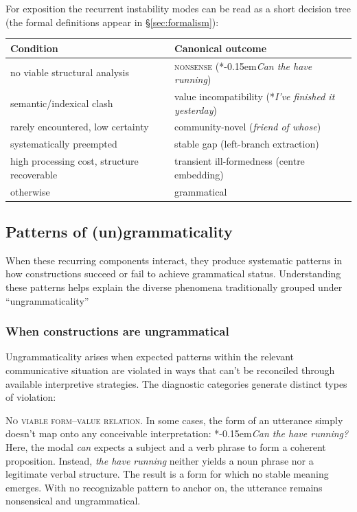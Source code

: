 \documentclass[12pt,letterpaper]{article}
\newcommand{\term}[1]{\textsc{#1}}
\newcommand{\mention}[1]{\textit{#1}}
\newcommand{\judgesep}{\kern-0.15em}
\newcommand{\ungram}[1]{*\judgesep#1}
\begin{document}
For exposition the recurrent instability modes can be read as a short decision tree (the formal definitions appear in \S\ref{sec:formalism}):

\begin{center}
\begin{tabular}{@{}l@{\;$\longrightarrow$\;}l@{}}
\toprule
Condition & Canonical outcome\\
\midrule
no viable structural analysis &
\term{nonsense} (\ungram{\mention{Can the have running}})\\[4pt]
semantic/indexical clash &
value incompatibility (*\textit{I've finished it yesterday})\\[4pt]
rarely encountered, low certainty &
community-novel (\textit{friend of whose})\\[4pt]
systematically preempted &
stable gap (left-branch extraction)\\[4pt]
high processing cost, structure recoverable &
transient ill-formedness (centre embedding)\\[4pt]
otherwise &
grammatical\\
\bottomrule
\end{tabular}
\end{center}


\subsection{Patterns of (un)grammaticality}\label{sec:patterns}

When these recurring components interact, they produce systematic patterns in how constructions succeed or fail to achieve grammatical status. Understanding these patterns helps explain the diverse phenomena traditionally grouped under \enquote{ungrammaticality}

\subsubsection{When constructions are ungrammatical}\label{sec:ungrammatical}

Ungrammaticality arises when expected patterns within the relevant communicative situation are violated in ways that can't be reconciled through available interpretive strategies. The diagnostic categories generate distinct types of violation:

\textsc{No viable form--value relation.}
In some cases, the form of an utterance simply doesn't map onto any conceivable interpretation:
\ea\label{ex:running-pattern}\ungram{\mention{Can the have running?}}
\z
Here, the modal \mention{can} expects a subject and a verb phrase to form a coherent proposition. Instead, \mention{the have running} neither yields a noun phrase nor a legitimate verbal structure. The result is a form for which no stable meaning emerges. With no recognizable pattern to anchor on, the utterance remains nonsensical and ungrammatical.
\end{document}
